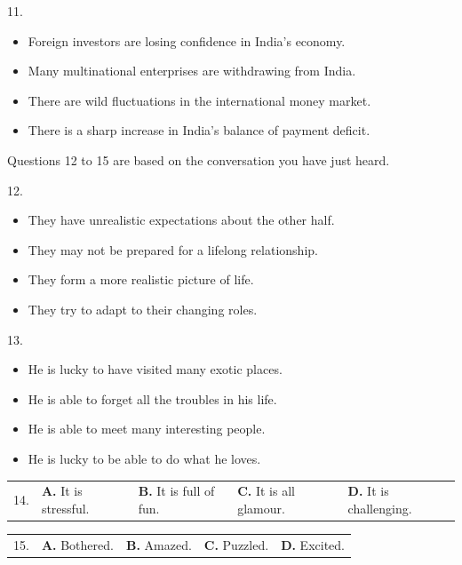 \documentclass[UTF8,11pt]{ctexart}
\begin{document}
11.


\begin{itemize}[leftmargin=2em,itemsep=.2em,topsep=.4em]\item[A.] Foreign investors are losing confidence in India’s economy.
\item[B.] Many multinational enterprises are withdrawing from India.
\item[C.] There are wild fluctuations in the international money market.
\item[D.] There is a sharp increase in India’s balance of payment deficit.
\end{itemize}

Questions 12 to 15 are based on the conversation you have just heard.


12.


\begin{itemize}[leftmargin=2em,itemsep=.2em,topsep=.4em]\item[A.] They have unrealistic expectations about the other half.
\item[B.] They may not be prepared for a lifelong relationship.
\item[C.] They form a more realistic picture of life.
\item[D.] They try to adapt to their changing roles.
\end{itemize}

13.


\begin{itemize}[leftmargin=2em,itemsep=.2em,topsep=.4em]\item[A.] He is lucky to have visited many exotic places.
\item[B.] He is able to forget all the troubles in his life.
\item[C.] He is able to meet many interesting people.
\item[D.] He is lucky to be able to do what he loves.
\end{itemize}

\noindent\begin{tabularx}{\linewidth}{@{}lXXXX@{}}14. & \textbf{A.} It is stressful. & \textbf{B.} It is full of fun. & \textbf{C.} It is all glamour. & \textbf{D.} It is challenging.\\\end{tabularx}\par

\noindent\begin{tabularx}{\linewidth}{@{}lXXXX@{}}15. & \textbf{A.} Bothered. & \textbf{B.} Amazed. & \textbf{C.} Puzzled. & \textbf{D.} Excited.\\\end{tabularx}\par
\end{document}
